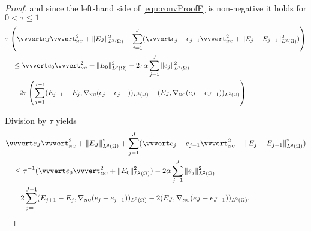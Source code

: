 \begin{proof}
  \noindent and since the left-hand side of
  \eqref{equ:convProofF} is non-negative it holds for $0<\tau\leq 1$ 
  \begin{align*}
    &\tau\left(\vvvert e_J \vvvert^2_\nc +\Vert E_J \Vert_{L^2(\Omega)}^2 
    +\sum_{j=1}^J(\vvvert e_j-e_{j-1} \vvvert_\nc^2 + 
    \Vert E_j-E_{j-1}\Vert_{L^2(\Omega)}^2)\right) \\
    &\quad \leq 
    \vvvert e_0 \vvvert_\nc^2 + \Vert E_0 \Vert_{L^2(\Omega)}^2 
    -2\tau\alpha\sum_{j=1}^J \Vert e_j\Vert^2_{L^2(\Omega)} \\
    &\quad\quad
    2\tau\left( 
    \sum_{j=1}^{J-1} 
    (E_{j+1}-E_j,\gradnc(e_j-e_{j-1}))_{L^2(\Omega)}
    -(E_J,\gradnc(e_J-e_{J-1}))_{L^2(\Omega)}\right)
  \end{align*}
  
  \noindent Division by $\tau$ yields
  \begin{align}
    \label{equ:convProofG}
    &\vvvert e_J \vvvert^2_\nc +\Vert E_J \Vert_{L^2(\Omega)}^2 
    +\sum_{j=1}^J(\vvvert e_j-e_{j-1} \vvvert_\nc^2 + 
    \Vert E_j-E_{j-1}\Vert_{L^2(\Omega)}^2) \notag\\
    &\quad \leq 
    \tau^{-1}(\vvvert e_0 \vvvert_\nc^2 + \Vert E_0 \Vert_{L^2(\Omega)}^2 )
    -2\alpha\sum_{j=1}^J \Vert e_j\Vert^2_{L^2(\Omega)} \\
    &\quad\quad
    2 
    \sum_{j=1}^{J-1} 
    (E_{j+1}-E_j,\gradnc(e_j-e_{j-1}))_{L^2(\Omega)}
    -2(E_J,\gradnc(e_J-e_{J-1}))_{L^2(\Omega)}.\notag
  \end{align}



\end{proof}
